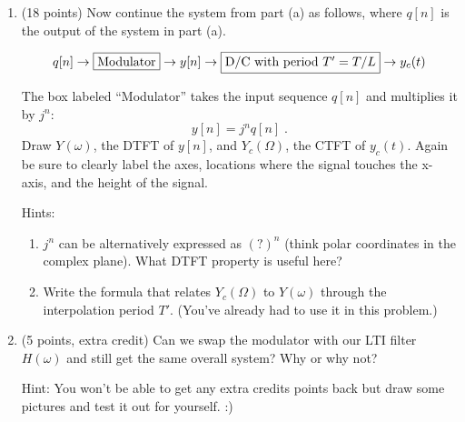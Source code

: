 \documentclass[]{siamltex}
\begin{document}
\begin{enumerate}
\begin{enumerate}
	\newpage
	\item (18 points) Now continue the system from part (a) as follows, where $q[n]$ is the output of the system in part (a).
	
	$$q[n] \rightarrow \fbox{Modulator} \rightarrow y[n] \rightarrow  \fbox{D/C with period $T' = T/L$} \rightarrow y_c(t)$$
	
	
	The box labeled ``Modulator'' takes the input sequence $q[n]$ and multiplies it by $j^n$: $$y[n] = j^n q[n]\;.$$ Draw $Y(\omega)$, the DTFT of $y[n]$, and $Y_c(\Omega)$, the CTFT of $y_c(t)$. Again be sure to clearly label the axes, locations where the signal touches the x-axis, and the height of the signal.
	
	Hints: 
		\begin{enumerate}
			\item $j^n$ can be alternatively expressed as $(?)^n$ (think polar coordinates in the complex plane). What DTFT property is useful here?
			\item Write the formula that relates $Y_c(\Omega)$ to $Y(\omega)$ through the interpolation period $T'$. (You've already had to use it in this problem.)
		\end{enumerate}
	
	\vspace{4in}
	\item (5 points, extra credit) Can we swap the modulator with our LTI filter $H(\omega)$ and still get the same overall system? Why or why not?
	
	Hint: You won't be able to get any extra credits points back but draw some pictures and test it out for yourself. :)
	\end{enumerate}








\end{enumerate}
\end{document}
